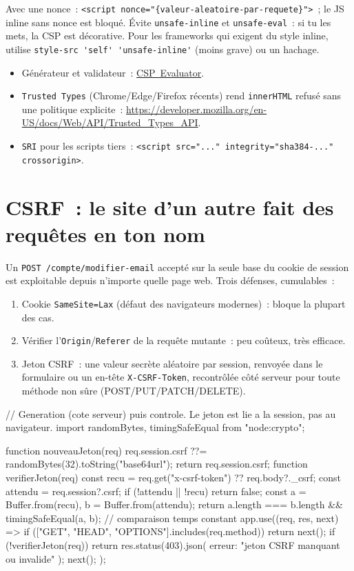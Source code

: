 \documentclass[12pt,a4paper,twoside,openright]{book}
\newcommand{\link}[2]{\href{#2}{#1}}
\begin{document}
Avec une nonce~: \verb|<script nonce="{valeur-aleatoire-par-requete}">|~; le JS inline sans nonce
est bloqu\'e. \'Evite \verb|unsafe-inline| et \verb|unsafe-eval|~: si tu les mets, la CSP est
d\'ecorative. Pour les frameworks qui exigent du style inline, utilise
\verb|style-src 'self' 'unsafe-inline'| (moins grave) ou un hachage.

\begin{itemize}
  \item G\'en\'erateur et validateur~: \link{CSP~Evaluator}{https://csp-evaluator.withgoogle.com/}.
  \item \texttt{Trusted Types} (Chrome/Edge/Firefox r\'ecents) rend \texttt{innerHTML} refus\'e sans
        une politique explicite~: \url{https://developer.mozilla.org/en-US/docs/Web/API/Trusted_Types_API}.
  \item \texttt{SRI} pour les scripts tiers~: \verb|<script src="..." integrity="sha384-..." crossorigin>|.
\end{itemize}

\section{CSRF~: le site d'un autre fait des requ\^etes en ton nom}

Un \verb|POST /compte/modifier-email| accept\'e sur la seule base du cookie de session est
exploitable depuis n'importe quelle page web. Trois d\'efenses, cumulables~:

\begin{enumerate}
  \item Cookie \verb|SameSite=Lax| (d\'efaut des navigateurs modernes)~: bloque la plupart des cas.
  \item V\'erifier l'\verb|Origin|/\verb|Referer| de la requ\^ete mutante~: peu co\^uteux, tr\`es efficace.
  \item Jeton CSRF~: une valeur secr\`ete al\'eatoire par session, renvoy\'ee dans le formulaire ou
        un en-t\^ete \verb|X-CSRF-Token|, recontr\^ol\'ee c\^ot\'e serveur pour toute m\'ethode
        non s\^ure (POST/PUT/PATCH/DELETE).
\end{enumerate}

\begin{codejs}
// Generation (cote serveur) puis controle. Le jeton est lie a la session, pas au navigateur.
import { randomBytes, timingSafeEqual } from "node:crypto";

function nouveauJeton(req) {
  req.session.csrf ??= randomBytes(32).toString("base64url");
  return req.session.csrf;
}
function verifierJeton(req) {
  const recu = req.get("x-csrf-token") ?? req.body?._csrf;
  const attendu = req.session?.csrf;
  if (!attendu || !recu) return false;
  const a = Buffer.from(recu), b = Buffer.from(attendu);
  return a.length === b.length && timingSafeEqual(a, b);       // comparaison temps constant
}
app.use((req, res, next) => {
  if (["GET", "HEAD", "OPTIONS"].includes(req.method)) return next();
  if (!verifierJeton(req)) return res.status(403).json({ erreur: "jeton CSRF manquant ou invalide" });
  next();
});
\end{codejs}
\end{document}
